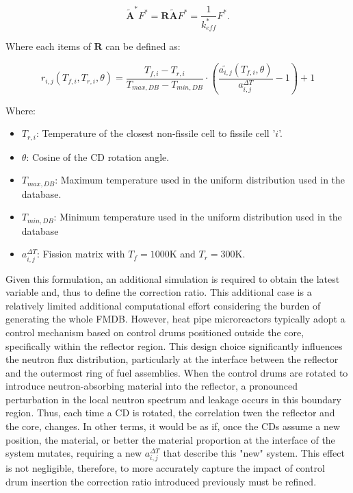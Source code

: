 \documentclass[preprint,review,12pt]{elsarticle}
\begin{document}
\begin{equation}
\tilde{\textbf{A}}^{*} F^{*} = \textbf{R}\tilde{\textbf{A}} F^* = \frac{1}{k^*_{eff}} F^*.
\end{equation}


Where each items of $\textbf{R}$ can be defined as: 

\begin{equation}
r_{i,j}(T_{f,i}, T_{r,i}, \theta) = \frac{T_{f,i} - T_{r,i}}{T_{max,DB} - T_{min,DB}} \cdot \left( \frac{ \tilde{a_{i,j}}(T_{f,i}, \theta)}{a_{i,j}^{\Delta T}} - 1 \right) + 1
\label{eq:correction_ratio_1}
\end{equation}

Where: 

\begin{itemize}
    \item $T_{r,i}$: Temperature of the closest non-fissile cell to fissile cell '$i$'. 
    \item $ \theta $: Cosine of the CD rotation angle.     
    \item $T_{max,DB}$: Maximum temperature used in the uniform distribution used in the database.  
    \item $T_{min,DB}$: Minimum temperature used in the uniform distribution used in the database 
    \item $a_{i,j}^{\Delta T}$: Fission matrix with $T_{f}=1000$K and $T_{r}=300$K.   
\end{itemize}

Given this formulation, an additional simulation is required to obtain the latest variable and, thus to define the correction ratio. This additional case is a relatively limited additional computational effort considering the burden of generating the whole FMDB.  
However, heat pipe microreactors typically adopt a control mechanism based on control drums positioned outside the core, specifically within the reflector region. This design choice significantly influences the neutron flux distribution, particularly at the interface between the reflector and the outermost ring of fuel assemblies. When the control drums are rotated to introduce neutron-absorbing material into the reflector, a pronounced perturbation in the local neutron spectrum and leakage occurs in this boundary region. Thus, each time a CD is rotated, the correlation twen the reflector and the core, changes. In other terms, it would be as if, once the CDs assume a new position, the material, or better the material proportion at the interface of the system mutates, requiring a new  $a_{i,j}^{\Delta T}$ that describe this "new" system. 
This effect is not negligible, therefore, to more accurately capture the impact of control drum insertion the correction ratio introduced previously must be refined. 
\end{document}
